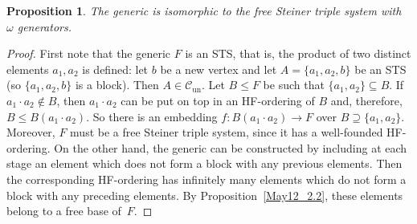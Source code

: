 \documentclass[10pt,a4paper]{article}
\newcommand{\Cun}{\mathcal{C}_\mathrm{un}}
\theoremstyle{note}
\newtheorem{prop}[thm]{Proposition}
\begin{document}
	\begin{prop}\label{Feb_23_2024_4} The generic is isomorphic to the free Steiner triple system with $\omega$ generators.
	\end{prop}

	\begin{proof} First note that the generic $F$ is an STS, that is, the product of two distinct elements $a_1,a_2$ is defined: let $b$ be a new vertex and let $A=\{a_1,a_2,b\}$ be an STS (so $ \{a_1, a_2, b \}$ is a block). Then $A\in\Cun$.  Let $B \leq F$ be such that $  \{a_1, a_2\} \subseteq B$. If $a_1 \cdot a_2 \notin B$, then $a_1 \cdot a_2$ can be put on top in an HF-ordering of $B$ and, therefore, $B \leq B(a_1 \cdot a_2)$. So there is an embedding $f:B(a_1 \cdot a_2)\rightarrow F$ over $B \supseteq\{a_1,a_2\}$. Moreover, $F$ must be a free Steiner triple system, since it has a well-founded HF-ordering.  On the other hand, the generic can be constructed by  including at each stage an element which does not form a block with any previous elements. Then the corresponding  HF-ordering has infinitely many elements which do not form a block with any preceding elements. By Proposition~\ref{May12_2.2}, these elements belong to a free base of~$F$.
	
	\end{proof}
\end{document}
